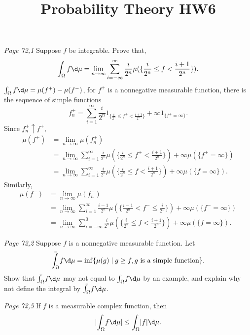 


\title{Probability Theory HW6}
\author{\asemail}
\maketitle

\begin{enumerate}
	\isep[1em]

\prob\textit{Page 72,1}
Suppose $f$ be integrable. Prove that, $$
\int_\Omega f \d \mu = \lim_{n\to \infty}\sum_{i=-\infty}^\infty \frac{i}{2^n} \mu(\{\frac{i}{2^n}\leq f< \frac{i+1}{2^n}\}). $$
\soln
$\int_\Omega f \d \mu = \mu(f^+)-\mu(f^-)$, for $f^+$ is a nonnegative measurable function, there is the sequence of simple functions $$
f^+_n= \sum_{i=1}^\infty \frac{i}{2^n} 1_{\{\frac{i}{2^n}\leq f^+< \frac{i+1}{2^n}\}}+\infty 1_{\{f^+=\infty\}}. $$
Since $f^+_n \uparrow f^+$, 
\begin{align*}
	\mu(f^+) & =\lim_{n\to \infty} \mu(f^+_n) \\
	& =\lim_{n\to \infty}\sum_{i=1}^\infty \frac{i}{2^n} \mu(\{\frac{i}{2^n}\leq f^+< \frac{i+1}{2^n}\}) +\infty \mu(\{f^+=\infty\}) \\
	& =\lim_{n\to \infty}\sum_{i=1}^\infty \frac{i}{2^n} \mu(\{\frac{i}{2^n}\leq f< \frac{i+1}{2^n}\}) +\infty \mu(\{f=\infty\}).
\end{align*}
Similarly, 
\begin{align*}
	\mu(f^-) & =\lim_{n\to \infty} \mu(f^-_n) \\
	& =\lim_{n\to \infty}\sum_{i=1}^\infty \frac{i-1}{2^n} \mu(\{\frac{i-1}{2^n}< f^- \leq \frac{i}{2^n}\}) +\infty \mu(\{f^-=\infty\}) \\
	& =\lim_{n\to \infty}\sum_{i=-\infty}^0 \frac{i}{2^n} \mu(\{\frac{i}{2^n}\leq f< \frac{i+1}{2^n}\}) +\infty \mu(\{f=\infty\}).
\end{align*}

\newpage
\prob\textit{Page 72,2}
Suppose $f$ is a nonnegative measurable function. Let $$
\bar{\int_\Omega} f \d\mu = \inf\{\mu(g) \mid g\geq f, g \text{ is a simple function} \}. $$
Show that $\bar{\int_\Omega} f \d\mu$ may not equal to ${\int_\Omega} f \d\mu$ by an example, and explain why not define the integral by $\bar{\int_\Omega} f \d\mu$.
\soln 
\vspace{4cm}

\prob\textit{Page 72,5}
If $f$ is a measurable complex function, then $$
| {\int_\Omega} f \d\mu | \leq {\int_\Omega} |f| \d\mu.$$
\soln
\vspace{4cm}

\prob

\soln 


\end{enumerate}